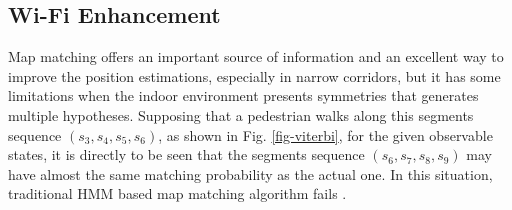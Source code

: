 \documentclass[conference]{IEEEtran}
\begin{document}
\subsection{Wi-Fi Enhancement}
Map matching offers an important source of information and an excellent way to improve the position estimations, especially in narrow corridors, but it has some limitations when the indoor environment presents symmetries that generates multiple hypotheses. Supposing that a pedestrian walks along this segments sequence $(s_3, s_4, s_5, s_6)$, as shown in Fig. \ref{fig-viterbi}, for the given observable states, it is directly to be seen that the segments sequence $(s_6, s_7, s_8, s_9)$ may have almost the same matching probability as the actual one. In this situation, traditional HMM based map matching algorithm fails \cite{zhou2015activity}.
\end{document}
